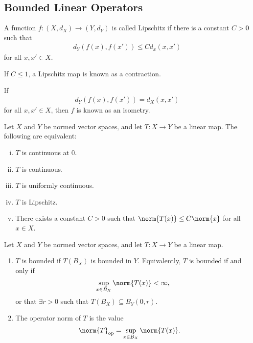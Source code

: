 \documentclass[10pt]{mypackage}
\begin{document}
\subsection{Bounded Linear Operators}%
\begin{definition}
  A function $f: \left(X, d_X\right)\rightarrow \left(Y,d_Y\right)$ is called Lipschitz if there is a constant $C>0$ such that
  \begin{align*}
    d_Y\left(f(x),f(x')\right) \leq Cd_x\left(x,x'\right)
  \end{align*}
  for all $x,x'\in X$.\newline

  If $C \leq 1$, a Lipschitz map is known as a contraction.\newline

  If
  \begin{align*}
    d_Y\left(f(x),f\left(x'\right)\right) = d_X\left(x,x'\right)
  \end{align*}
  for all $x,x'\in X$, then $f$ is known as an isometry.
\end{definition}
\begin{proposition}
  Let $X$ and $Y$ be normed vector spaces, and let $T: X\rightarrow Y$ be a linear map. The following are equivalent:
  \begin{enumerate}[(i)]
    \item $T$ is continuous at $0$.
    \item $T$ is continuous.
    \item $T$ is uniformly continuous.
    \item $T$ is Lipschitz.
    \item There exists a constant $C > 0$ such that $\norm{T(x)}\leq C\norm{x}$ for all $x\in X$.
  \end{enumerate}
\end{proposition}
\begin{definition}
  Let $X$ and $Y$ be normed vector spaces, and let $T: X\rightarrow Y$ be a linear map.
  \begin{enumerate}[(1)]
    \item $T$ is bounded if $T\left(B_X\right)$ is bounded in $Y$. Equivalently, $T$ is bounded if and only if
      \begin{align*}
        \sup_{x\in B_X}\norm{T(x)} < \infty,
      \end{align*}
      or that $\exists r > 0$ such that $T\left(B_X\right) \subseteq B_Y\left(0,r\right)$.
    \item The operator norm of $T$ is the value
      \begin{align*}
        \norm{T}_{\text{op}} &= \sup_{x\in B_X}\norm{T(x)}.
      \end{align*}
  \end{enumerate}
\end{definition}
\end{document}
